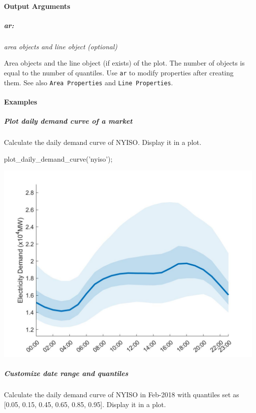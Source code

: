 \documentclass[11pt]{article}
\numberwithin{equation}{section}
\numberwithin{table}{section}
\numberwithin{figure}{section}
\begin{document}
\paragraph{Output Arguments}
\subparagraph{ar:} \textit{area objects and line object (optional)}

Area objects and the line object (if exists) of the plot. The number of objects is equal to the number of quantiles. Use \verb!ar! to modify properties after creating them. See also \verb!Area Properties! and \verb!Line Properties!.



\paragraph{Examples}
\subparagraph{Plot daily demand curve of a market}

Calculate the daily demand curve of NYISO. Display it in a plot.

\begin{Code}
  plot_daily_demand_curve('nyiso');
\end{Code}

\begin{center}
  \noindent\includegraphics[width=\textwidth]{figures/plot_daily_demand_curve_example1.jpg}
\end{center}



\subparagraph{Customize date range and quantiles}

Calculate the daily demand curve of NYISO in Feb-2018 with quantiles set as [0.05, 0.15, 0.45, 0.65, 0.85, 0.95]. Display it in a plot.
\end{document}
